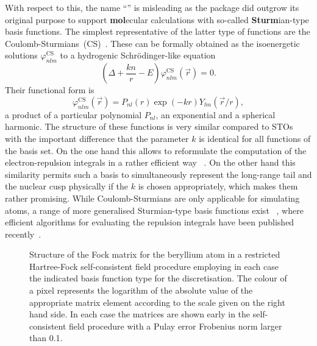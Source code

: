 With respect to this, the name ``\molsturm'' is misleading
as the package did outgrow its original purpose to support
\textbf{mol}ecular calculations with so-called \textbf{Sturm}ian-type
basis functions.
The simplest representative of the latter type of functions
are the Coulomb-Sturmians~(CS)~\cite{Shull1959,Rotenberg1962,Rotenberg1970}.
These can be formally obtained as the isoenergetic solutions
$\varphi^\text{CS}_{nlm}$ to a hydrogenic Schrödinger-like equation
\begin{equation}
	\left( \Delta + \frac{k n}{r} - E \right) \varphi^\text{CS}_{nlm}(\vec{r}) = 0.
	\label{eqn:CS}
\end{equation}
Their functional form is
\begin{equation}
	\varphi^\text{CS}_{nlm}(\vec{r}) = P_{nl}(r) \exp(- k r) Y_{lm}\left(\vec{r} / r \right),
	\label{eqn:CSProduct}
\end{equation}
\ie a product of a particular polynomial $P_{nl}$,
an exponential and a spherical harmonic.
The structure of these functions is very similar compared to STOs
with the important difference that the parameter $k$ is identical for
all functions of the basis set.
On the one hand this allows to reformulate the computation
of the electron-repulsion integrals in a rather efficient way%
~\cite{Avery2011PhD,Avery2011}.
On the other hand this similarity permits such a basis to simultaneously
represent the long-range tail and the nuclear cusp physically
if the $k$ is chosen appropriately,
which makes them rather promising.
While Coulomb-Sturmians are only applicable for simulating atoms,
a range of more generalised Sturmian-type basis functions exist%
~\cite{Avery2011},
where efficient algorithms for evaluating the repulsion integrals
have been published recently~\cite{Avery2006,Avery2015,Morales2016,Avery2017}.

\begin{figure}
	\centering
	\caption{
		Structure of the Fock matrix for the beryllium atom
		in a restricted Hartree-Fock self-consistent field procedure
		employing in each case the indicated basis function type
		for the discretisation.
		The colour of a pixel represents the logarithm
		of the absolute value of the appropriate matrix element
		according to the scale given on the right hand side.
		In each case the matrices are shown early in the self-consistent
		field procedure with a Pulay error Frobenius norm larger than 0.1.
	}
	\label{fig:FockStructure}
\end{figure}


